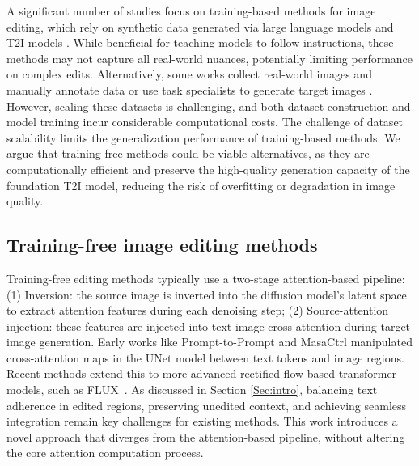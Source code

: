 \documentclass{article}
\begin{document}
A significant number of studies focus on training-based methods for image editing, which rely on synthetic data generated via large language models and T2I models \citep{brooks2023instructpix2pix, hui2024hq}. While beneficial for teaching models to follow instructions, these methods may not capture all real-world nuances, potentially limiting performance on complex edits. Alternatively, some works collect real-world images and manually annotate data or use task specialists to generate target images \citep{zhang2023magicbrush, wasserman2024paint, wei2024omniedit}. However, scaling these datasets is challenging, and both dataset construction and model training incur considerable computational costs.
The challenge of dataset scalability limits the generalization performance of training-based methods. We argue that training-free methods could be viable alternatives, as they are computationally efficient and preserve the high-quality generation capacity of the foundation T2I model, reducing the risk of overfitting or degradation in image quality.


\vspace{-1mm}

\subsection{Training-free image editing methods}
\vspace{-1mm}





Training-free editing methods typically use a two-stage attention-based pipeline: (1) Inversion: the source image is inverted into the diffusion model's latent space to extract attention features during each denoising step; (2) Source-attention injection: these features are injected into text-image cross-attention during target image generation. Early works like Prompt-to-Prompt \citep{hertz2022prompt} and MasaCtrl \citep{cao2023masactrl} manipulated cross-attention maps in the UNet model between text tokens and image regions. Recent methods \citep{rout2024semantic,wang2024taming,deng2024fireflow,tewel2025addit,zhu2025kv} extend this to more advanced rectified-flow-based transformer models, such as FLUX~\citep{blackforest2024FLUX}. As discussed in Section \ref{Sec:intro}, balancing text adherence in edited regions, preserving unedited context, and achieving seamless integration remain key challenges for existing methods. This work introduces a novel approach that diverges from the attention-based pipeline, without altering the core attention computation process.
\end{document}
